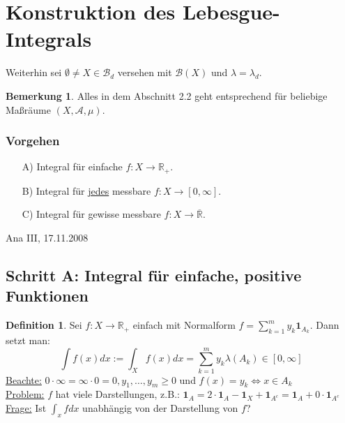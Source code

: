 \documentclass[a4paper]{scrreprt}
\newcommand{\doubleOne}{\textbf{1}}
\newcommand{\R}{\mathbb{R}}
\newcommand{\Rq}{\overline{\R}}
\newcommand{\Borel}{\mathcal{B}}
\newcommand{\Bd}{\Borel_d}
\newcommand{\jlabel}[1]{\label{j_#1}}
\newcommand{\jabb}[3]{ #1: #2 \rightarrow #3 }
\newcommand{\jspacesmall}{\vspace{4pt}}
\newcommand{\jdate}[1]{\jspacesmall\begin{center}\jlabel{#1}\tiny{Ana III, #1}\end{center}}
\theoremstyle{plain}
\theoremstyle{definition}
\newtheorem{defn}[thm]{Definition}
\newtheorem*{bem*}{Bemerkung}
\begin{document}
{{{    %
\section{Konstruktion des Lebesgue-Integrals}

Weiterhin sei $\emptyset \ne X \in \Bd$ versehen mit $\Borel(X)$ und $\lambda = \lambda_d$.
\begin{bem*}
    Alles in dem Abschnitt 2.2 geht entsprechend für beliebige Maßräume $(X,\mathcal{A}, \mu)$.
\end{bem*}

\subsubsection*{Vorgehen}
\begin{itemize}
    \item[A)] Integral für einfache $\jabb{f}{X}{\R_+}$.
    \item[B)] Integral für \uline{jedes} messbare $\jabb{f}{X}{[0,\infty]}$.
    \item[C)] Integral für gewisse messbare $\jabb{f}{X}{\Rq}$.
\end{itemize}


\jdate{17.11.2008}
 
\subsection*{Schritt A: Integral für einfache, positive Funktionen}

\begin{defn}
\jlabel{Def 2.13}
    Sei $f: X \rightarrow \R_+$ einfach mit Normalform $f = \sum_{k=1}^m y_k \doubleOne_{A_k}$. Dann setzt man:
    \begin{displaymath}
        \int f(x) dx := \int_X f(x) dx = \sum_{k=1}^m y_k \lambda(A_k) \in [0, \infty]
    \end{displaymath} 
    \uline{Beachte:} $0\cdot\infty = \infty\cdot 0 = 0, y_1, \dots, y_m \ge 0$ und $f(x) = y_k \Leftrightarrow x \in A_k$ \\
    \uline{Problem:} $f$ hat viele Darstellungen, z.B.: $\doubleOne_A = 2\cdot \doubleOne_A - \doubleOne_X + \doubleOne_{A^c} = \doubleOne_A + 0\cdot \doubleOne_{A^c}$ \\
    \uline{Frage:} Ist $\int_x f dx$ unabhängig von der Darstellung von $f$?
\end{defn}

}}}
\end{document}
